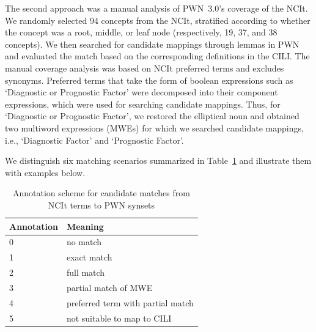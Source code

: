 \documentclass[11pt]{article}
\begin{document}
The second approach was a manual analysis of PWN~3.0's coverage of the NCIt. We randomly selected 94 concepts from the NCIt, stratified according to whether the concept was a root, middle, or leaf node (respectively, 19, 37, and 38 concepts). We then searched for candidate mappings through lemmas in PWN and evaluated the match based on the corresponding definitions in the CILI. The manual coverage analysis was based on NCIt preferred terms and excludes synonyms. Preferred terms that take the form of boolean expressions such as `Diagnostic or Prognostic Factor' were decomposed into their component expressions, which were used for searching candidate mappings. Thus, for `Diagnostic or Prognostic Factor', we restored the elliptical noun and obtained two multiword expressions (MWEs) for which we searched candidate mappings, i.e., `Diagnostic Factor' and `Prognostic Factor'. 

We distinguish six matching scenarios summarized in Table~\ref{Manual_annotations} and illustrate them with examples below.
\begin{table}[h]
\begin{center}
\begin{tabular}{|l|l|}
\hline \bf Annotation & \bf Meaning \\
\hline 
0 & no match%
\\
1 & exact match%
\\
2 & full match%
\\
3 & partial match of MWE%
\\
4 & preferred term with partial match%
\\
5 & not suitable to map to CILI
\\
\hline
\end{tabular}
\caption{\label{Manual_annotations}Annotation scheme for candidate matches from NCIt terms to PWN synsets}
\end{center}
\end{table}
\end{document}
